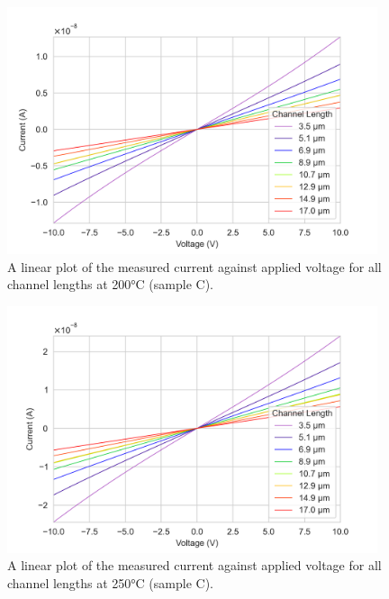 \begin{figure}[h]
    \centering
    \includegraphics[width=0.97\textwidth]{Chapter6/Figs/Raster/Sample C 2019/IV/10V IV characteristics at 200 C.png}
    \caption{A linear plot of the measured current against applied voltage for all channel lengths at 200\si{\degreeCelsius} (sample C).}
    \label{appfig:C_current_voltage_200}
\end{figure}
\begin{figure}[h]
    \centering
    \includegraphics[width=0.97\textwidth]{Chapter6/Figs/Raster/Sample C 2019/IV/10V IV characteristics at 250 C.png}
    \caption{A linear plot of the measured current against applied voltage for all channel lengths at 250\si{\degreeCelsius} (sample C).}
    \label{appfig:C_current_voltage_250}
\end{figure}
